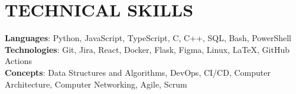 \section{\textbf {\large TECHNICAL SKILLS}}
    \begin{itemize}[leftmargin=0.15in, label={}]
	\small{\item{
		\textbf{Languages}{: Python, JavaScript, TypeScript, C, C++, SQL, Bash, PowerShell} \\
		\textbf{Technologies}{: Git, Jira, React, Docker, Flask, Figma, Linux, LaTeX, GitHub Actions} \\
		\textbf{Concepts}{: Data Structures and Algorithms, DevOps, CI/CD, Computer Architecture, Computer Networking, Agile, Scrum}
	}}
    \end{itemize}
